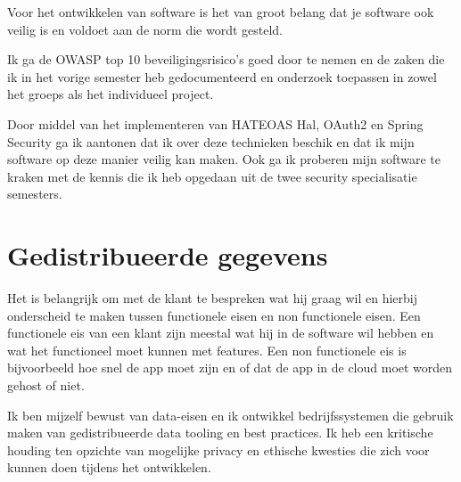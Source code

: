 Voor het ontwikkelen van software is het van groot belang dat je software ook veilig is en voldoet aan de norm die
wordt gesteld.

Ik ga de OWASP top 10 beveiligingsrisico's goed door te nemen en de zaken die ik in het vorige semester heb
gedocumenteerd en onderzoek toepassen in zowel het groeps als het individueel project.

Door middel van het implementeren van HATEOAS Hal, OAuth2 en Spring Security ga ik aantonen dat ik over deze
technieken beschik en dat ik mijn software op deze manier veilig kan maken.
Ook ga ik proberen mijn software te kraken met de kennis die ik heb opgedaan uit de twee security specialisatie
semesters.





\section{Gedistribueerde gegevens}\label{sec:gedistribueerde-gegevens}

Het is belangrijk om met de klant te bespreken wat hij graag wil en hierbij onderscheid te maken tussen functionele
eisen en non functionele eisen.
Een functionele eis van een klant zijn meestal wat hij in de software wil hebben en wat het functioneel moet kunnen met features.
Een non functionele eis is bijvoorbeeld hoe snel de app moet zijn en of dat de app in de cloud moet worden gehost of
niet.

Ik ben mijzelf bewust van data-eisen en ik ontwikkel bedrijfssystemen die gebruik maken van gedistribueerde
data tooling en best practices.
Ik heb een kritische houding ten opzichte van mogelijke privacy en ethische kwesties die zich voor kunnen doen
tijdens het ontwikkelen.

